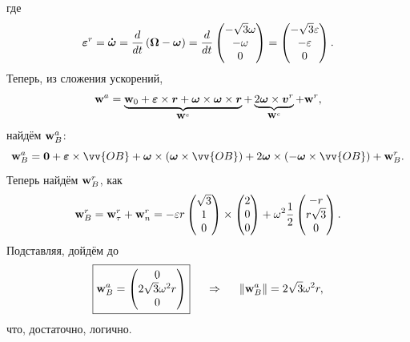 где
$$
    \mbox{\boldmath $\varepsilon$}^r = \mbox{\boldmath $\dot{\omega}$} = \frac{d}{dt} \left(\mbox{\boldmath $\Omega$} - \mbox{\boldmath $\omega$}\right) = \frac{d}{dt} \begin{pmatrix}
        - \sqrt{3} \omega \\ -\omega \\ 0
    \end{pmatrix} = \begin{pmatrix}
        - \sqrt{3} \varepsilon \\ - \varepsilon \\ 0
    \end{pmatrix}.
$$
Теперь, из сложения ускорений,
$$
    \mbox{\boldmath $\mathrm{w}$}^a = \underbrace{\mbox{\boldmath $\mathrm{w}$}_0 + \mbox{\boldmath $\varepsilon$} \times \mbox{\boldmath $r$} + \mbox{\boldmath $\omega$} \times \mbox{\boldmath $\omega$} \times \mbox{\boldmath $r$}}_{\mbox{\boldmath $\mathrm{w}$}^e} + \underbrace{2 \mbox{\boldmath $\omega$} \times \mbox{\boldmath $v$}^r}_{\mbox{\boldmath $\mathrm{w}$}^c} + \mbox{\boldmath $\mathrm{w}$}^r,
$$
найдём $\mbox{\boldmath $\mathrm{w}$}_B^a$:
$$
    \vc{\mathrm{w}}_B^a = \vc{0} + \vc{\varepsilon} \times \vv{OB} + \vc{\omega} \times \left(
        \vc{\omega} \times \vv{OB}
    \right) + 2 \vc{\omega} \times \left(- \vc{\omega} \times \vv{OB} \right) + \vc{\mathrm{w}}^r_B.
$$
Теперь найдём $\mbox{\boldmath $\mathrm{w}$}^r_B$, как
$$
    \mbox{\boldmath $\mathrm{w}$}^r_B = \mbox{\boldmath $\mathrm{w}$}_{\tau}^r + \mbox{\boldmath $\mathrm{w}$}_n^r =
    - \varepsilon r \begin{pmatrix}
        \sqrt{3} \\ 1 \\ 0
    \end{pmatrix} \times \begin{pmatrix}
        2 \\ 0 \\ 0
    \end{pmatrix} + \omega^2 \frac{1}{2} \begin{pmatrix}
        - r \\ r \sqrt{3} \\ 0
    \end{pmatrix}.
$$
Подставляя, дойдём до
$$
    \boxed{\mbox{\boldmath $\mathrm{w}$}_B^a = \begin{pmatrix}
        0 \\ 2 \sqrt{3} \omega^2 r \\ 0
    \end{pmatrix}}
    \hspace{0.5cm} \Rightarrow \hspace{0.5cm} 
    \|\mbox{\boldmath $\mathrm{w}$}^a_B\| = 2 \sqrt{3} \omega^2 r,
$$
что, достаточно, логично.

